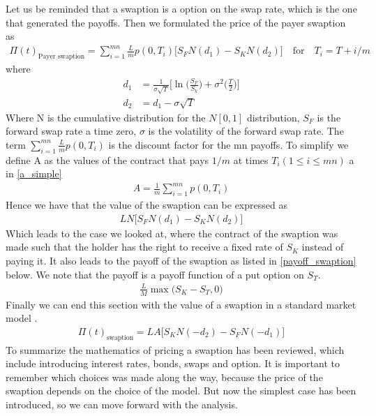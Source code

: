 Let us be reminded that a swaption is a option on the swap rate, which is the one that generated the payoffs.
Then we formulated the price of the payer swaption as \cite{Hull}
\begin{align*}
    \Pi(t)_{\text{Payer swaption}} = \sum_{i=1}^{mn} \frac{L}{m} p(0,T_i)\Big[ S_F N(d_1) - S_K N(d_2)\Big] \quad \text{for} \quad T_i= T+i/m  
\end{align*}
where
\begin{align*}
    d_1 & = \frac{1}{\sigma \sqrt{T}} \Big[ \ln \Big(\frac{S_F}{S_k}\Big)+\sigma^2\Big(\frac{T}{2}\Big)\Big] \\
    d_2 & = d_1-\sigma \sqrt{T}
\end{align*}
Where N is the cumulative distribution for the $N [0,1]$ distribution, $S_F$ is the forward swap rate a time
zero, $\sigma$ is the volatility of the forward swap rate. The term $\sum_{i=1}^{mn} \frac{L}{m} p(0,T_i)$ 
is the discount factor for the mn payoffs. To simplify we define A as the values of the contract that
pays $1/m$ at times $T_i ( 1\leq i \leq mn)$ a in \autoref{a_simple}
\begin{align}
    A= \frac{1}{m} \sum_{i=1}^{mn} p(0,T_i)
    \label{a_simple}
\end{align}
Hence we have that the value of the swaption can be expressed as 
\begin{align*}
    L N \Big[S_F N(d_1) - S_K N(d_2) \Big]
\end{align*}
Which leads to the case we looked at, where the contract of the swaption was made such that the 
holder has the right to receive a fixed rate of $S_K$ instead of paying it. It also leads to
the payoff of the swaption as listed in \autoref{payoff_swaption} below. We note that the payoff 
is a payoff function of a put option on $S_T$. 
\begin{align}
    \frac{L}{M} \max \Big( S_K - S_T, 0 \Big)
    \label{payoff_swaption}
\end{align}
Finally we can end this section with the value of a swaption in a standard market model \cite{Hull}.
\begin{align*}
    \Pi(t)_{\text{swaption}}= L A \Big[S_K N(-d_2) - S_F N(-d_1)\Big]
\end{align*}
To summarize the mathematics of pricing a swaption has been reviewed, which include introducing interest rates, 
bonds, swaps and option. It is important to remember which choices was made along the way,
because the price of the swaption depends on the choice of the model. But now the simplest case has been 
introduced, so we can move forward with the analysis. 